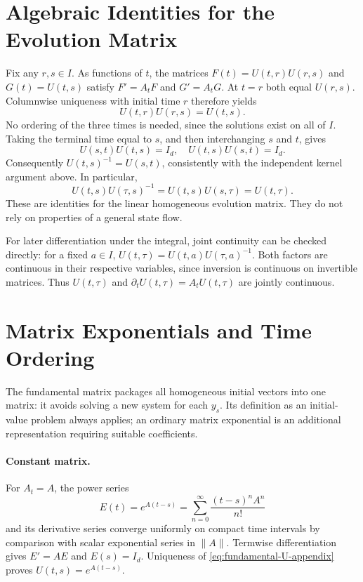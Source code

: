 \documentclass[12pt,a4paper,oneside]{book}
\begin{document}
\section{Algebraic Identities for the Evolution Matrix}
\label{app:linear-identities}
Fix any $r,s\in I$. As functions of $t$, the matrices
$F(t)=U(t,r)U(r,s)$ and $G(t)=U(t,s)$ satisfy
$F'=A_tF$ and $G'=A_tG$. At $t=r$ both equal $U(r,s)$.
Columnwise uniqueness with initial time $r$ therefore yields
\begin{equation*}
U(t,r)U(r,s)=U(t,s).
\end{equation*}
No ordering of the three times is needed, since the solutions exist
on all of $I$. Taking the terminal time equal to $s$, and then
interchanging $s$ and $t$, gives
\begin{equation*}
U(s,t)U(t,s)=I_d,\quad U(t,s)U(s,t)=I_d.
\end{equation*}
Consequently $U(t,s)^{-1}=U(s,t)$, consistently with the independent
kernel argument above. In particular,
\begin{equation*}
U(t,s)U(\tau,s)^{-1}=U(t,s)U(s,\tau)=U(t,\tau).
\end{equation*}
These are identities for the linear homogeneous evolution matrix.
They do not rely on properties of a general state flow.

For later differentiation under the integral, joint continuity
can be checked directly: for a fixed $a\in I$,
$U(t,\tau)=U(t,a)U(\tau,a)^{-1}$. Both factors are continuous
in their respective variables, since inversion is continuous on
invertible matrices. Thus $U(t,\tau)$ and
$\partial_tU(t,\tau)=A_tU(t,\tau)$ are jointly continuous.

\section{Matrix Exponentials and Time Ordering}
\label{app:linear-exponentials}
The fundamental matrix packages all homogeneous initial vectors
into one matrix: it avoids solving a new system for each $y_s$.
Its definition as an initial-value problem always applies;
an ordinary matrix exponential is an additional representation
requiring suitable coefficients.

\paragraph{Constant matrix.}
For $A_t=A$, the power series
\begin{equation*}
E(t)=e^{A(t-s)}=\sum_{n=0}^\infty\frac{(t-s)^nA^n}{n!}
\end{equation*}
and its derivative series converge uniformly on compact time
intervals by comparison with scalar exponential series in $\|A\|$.
Termwise differentiation gives $E'=AE$ and $E(s)=I_d$.
Uniqueness of \eqref{eq:fundamental-U-appendix} proves
$U(t,s)=e^{A(t-s)}$.
\end{document}
